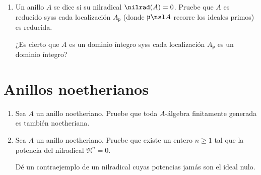 \documentclass[11pt, reqno]{amsart}
\begin{document}
\begin{enumerate}
	\item Un anillo $A$ se dice  si su nilradical $\nilrad(A) = 0$.
		Pruebe que $A$ es reducido syss cada localización $A_{\mathfrak{p}}$ (donde $\mathfrak{p} \nsl A$
		recorre los ideales primos) es reducida.

		\begin{prob}
			\lookup
			¿Es cierto que $A$ es un dominio íntegro syss cada localización $A_{\mathfrak{p}}$ es un dominio
			íntegro?
		\end{prob}
\end{enumerate}

\section{Anillos noetherianos}
\begin{enumerate}[resume]
	\item Sea $A$ un anillo noetheriano.
		Pruebe que toda $A$-álgebra finitamente generada es también noetheriana.
	\item Sea $A$ un anillo noetheriano. 
		Pruebe que existe un entero $n \ge 1$ tal que la potencia del nilradical $\mathfrak{N}^n = 0$.

		\begin{prob}
			Dé un contraejemplo de un nilradical cuyas potencias jamás son el ideal nulo.
		\end{prob}
\end{enumerate}

\appendix
\end{document}

